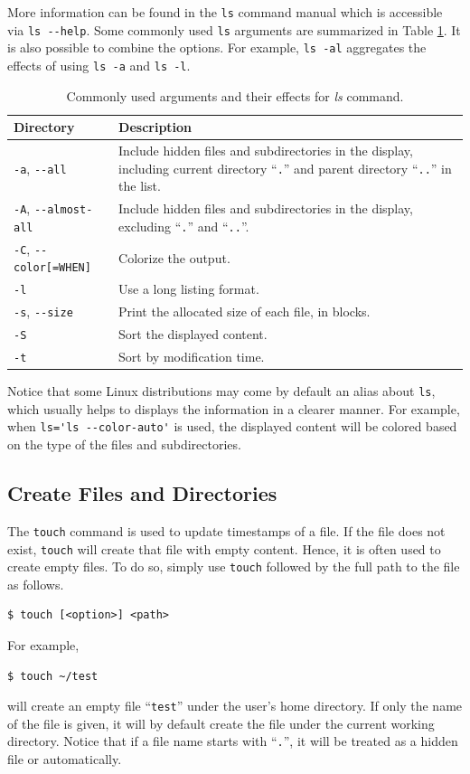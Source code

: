 More information can be found in the \verb|ls| command manual which is accessible via \verb|ls --help|. Some commonly used \verb|ls| arguments are summarized in Table \ref{ch:fm:tab:lscommandargument}. It is also possible to combine the options. For example, \verb|ls -al| aggregates the effects of using \verb|ls -a| and \verb|ls -l|.

\begin{table}[htbp]
  \centering \caption{Commonly used arguments and their effects for \textit{ls} command.}\label{ch:fm:tab:lscommandargument}
  \begin{tabularx}{\textwidth}{lX}
    \hline
    Directory & Description \\ \hline
    \verb|-a|, \verb|--all| & Include hidden files and subdirectories in the display, including current directory ``\verb|.|'' and parent directory ``\verb|..|'' in the list. \\ 
    \verb|-A|, \verb|--almost-all| & Include hidden files and subdirectories in the display, excluding ``\verb|.|'' and ``\verb|..|''. \\ 
    \verb|-C|, \verb|--color[=WHEN]| & Colorize the output. \\ 
    \verb|-l| & Use a long listing format. \\ 
    \verb|-s|, \verb|--size| & Print the allocated size of each file, in blocks. \\ 
    \verb|-S| & Sort the displayed content. \\ 
    \verb|-t| & Sort by modification time. \\
    \hline
  \end{tabularx}
\end{table}

Notice that some Linux distributions may come by default an alias about \verb|ls|, which usually helps to displays the information in a clearer manner. For example, when \verb|ls='ls --color-auto'| is used, the displayed content will be colored based on the type of the files and subdirectories.

\subsection{Create Files and Directories}

The \verb|touch| command is used to update timestamps of a file. If the file does not exist, \verb|touch| will create that file with empty content. Hence, it is often used to create empty files. To do so, simply use \verb|touch| followed by the full path to the file as follows.
\begin{lstlisting}
$ touch [<option>] <path>
\end{lstlisting}
For example,
\begin{lstlisting}
$ touch ~/test
\end{lstlisting}
will create an empty file ``\texttt{test}'' under the user's home directory. If only the name of the file is given, it will by default create the file under the current working directory. Notice that if a file name starts with ``\verb|.|'', it will be treated as a hidden file or automatically.

